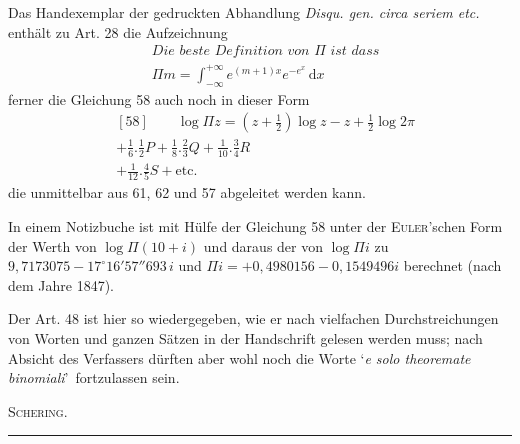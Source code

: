 Das Handexemplar der gedruckten Abhandlung \textit{Disqu. gen. circa seriem etc.} enthält zu Art. 28 die Aufzeichnung
\[
\begin{aligned}&\textit{Die beste Definition von }\Pi\textit{ ist dass}\\&
\Pi m=\int_{-\infty}^{+\infty}e^{(m+1)x}e^{-e^x}\,\mathrm dx\end{aligned}
\]
ferner die Gleichung 58 auch noch in dieser Form
\[
\begin{aligned}&[58]\qquad \log\Pi z=(z+\tfrac12)\log z-z+\tfrac12\log2\pi\\&+\tfrac16.\tfrac12 P+\tfrac18.\tfrac23 Q+\tfrac1{10}.\tfrac34 R\\&+\tfrac1{12}.\tfrac45 S+\text{etc.}\end{aligned}
\]
die unmittelbar aus 61, 62 und 57 abgeleitet werden kann.

In einem Notizbuche ist mit Hülfe der Gleichung 58 unter der \textsc{Euler}'schen Form der Werth von $\log\Pi(10+i)$ und daraus der von $\log\Pi i$ zu
$9{,}7173075-17^\circ16'57''693\,i$ und
$\Pi i=+0{,}4980156-0{,}1549496i$ berechnet (nach dem Jahre 1847).

Der Art. 48 ist hier so wiedergegeben, wie er nach vielfachen Durchstreichungen von Worten und ganzen Sätzen in der Handschrift gelesen werden muss; nach Absicht des Verfassers dürften aber wohl noch die Worte \lq\textit{e solo theoremate binomiali}\rq\ fortzulassen sein.
\begin{flushright}\textsc{Schering.}\end{flushright}
\begin{center}\rule{.4\linewidth}{.4pt}\end{center}

